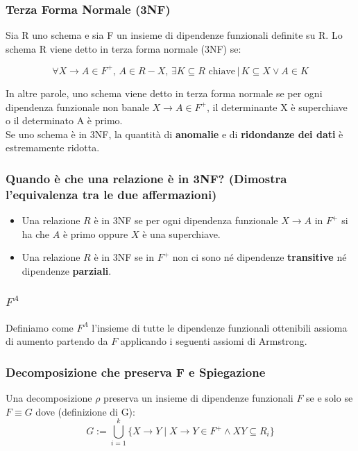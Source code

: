 \documentclass{article}
\begin{document}
\subsubsection{Terza Forma Normale (3NF)}
Sia R uno schema e sia F un insieme di dipendenze funzionali definite su R. Lo schema R viene detto in terza forma normale (3NF) se:

\[\forall X \rightarrow A \in F^+, \, A \in R - X, \, \exists K \subseteq R \text{ chiave} \,|\, K \subseteq X \vee A \in K\]

In altre parole, uno schema viene detto in terza forma normale se per ogni dipendenza funzionale non banale $X \rightarrow A \in F^+$, il determinante X è superchiave o il determinato A è primo.\\
Se uno schema è in 3NF, la quantità di \textbf{anomalie} e di \textbf{ridondanze dei dati} è estremamente ridotta.

\subsubsection{Quando è che una relazione è in 3NF? (Dimostra l'equivalenza tra le due affermazioni)}
\begin{itemize}
  \item Una relazione $R$ è in 3NF se per ogni dipendenza funzionale $X \rightarrow A$ in $F^+$ si ha che $A$ è primo oppure $X$ è una superchiave. \item Una relazione $R$ è in 3NF se in $F^+$ non ci sono né dipendenze \textbf{transitive} né dipendenze \textbf{parziali}.\\
\end{itemize}

\subsubsection{$F^A$}
Definiamo come $F^A$ l'insieme di tutte le dipendenze funzionali ottenibili assioma di aumento partendo da $F$ applicando i seguenti assiomi di Armstrong.

\subsubsection{Decomposizione che preserva F e Spiegazione}
Una decomposizione $\rho$ preserva un insieme di dipendenze funzionali $F$ se e solo se $F \equiv G$ dove (definizione di G):
\[ G := \bigcup_{i=1}^{k} \{X \rightarrow Y \mid X \rightarrow Y \in F^+ \land XY \subseteq R_i \} \]
\end{document}
